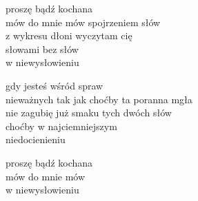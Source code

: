 \begin{text}
    proszę bądź kochana\\
    mów do mnie mów spojrzeniem słów\\
    z wykresu dłoni wyczytam cię\\
    słowami bez słów\\
    w niewysłowieniu

    gdy jesteś wśród spraw\\
    nieważnych tak jak choćby ta poranna mgła\\
    nie zagubię już smaku tych dwóch słów\\
    choćby w najciemniejszym\\
    niedocienieniu

    proszę bądź kochana\\
    mów do mnie mów\\
    w niewysłowieniu
\end{text}
\begin{chord}

\end{chord}